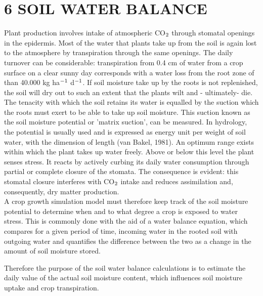 \documentclass[11pt]{article}
\newcommand{\FigDir}{.}
\begin{document}
\setcounter{page}{81}\pagenumpos{\pnbr}
\section{  6 SOIL WATER BALANCE  }

\bigskip
\bigskip
Plant production involves intake of atmospheric CO$_{{\rm 2}}$ through stomatal openings in the
epidermis. Most of the water that plants take up from the soil is again lost to the
atmosphere by transpiration through the same openings. The daily turnover can be
considerable: transpiration from 0.4 cm of water from a crop surface on a clear sunny
day corresponds with a water loss from the root zone of than 40.000 kg ha$^{{\rm -1}}$ d$^{{\rm -1}}$. If soil
moisture take up by the roots is not replenished, the soil will dry out to such an extent
that the plants wilt and - ultimately- die. \\
The tenacity with which the soil retains its water is equalled by the suction which the
roots must exert to be able to take up soil moisture. This suction known as the soil
moisture potential or 'matrix suction', can be measured. In hydrology, the potential is
usually used and is expressed as energy unit per weight of soil water, with the dimension
of length (van Bakel, 1981). An optimum range exists within which the plant takes up
water freely. Above or below this level the plant senses stress. It reacts by actively
curbing its daily water consumption through partial or complete closure of the stomata.
The consequence is evident: this stomatal closure interferes with CO$_{{\rm 2}}$ intake and reduces
assimilation and, consequently, dry matter production.\\
A crop growth simulation model must therefore keep track of the soil moisture potential
to determine when and to what degree a crop is exposed to water stress. This is common\-ly done with the aid of a water balance equation, which compares for a given period of
time, incoming water in the rooted soil with outgoing water and quantifies the difference
between the two as a change in the amount of soil moisture stored.

Therefore the purpose of the soil water balance calculations is to estimate the daily value
of the actual soil moisture content, which influences soil moisture uptake and crop
transpiration.\\
\begin{figure}[htbp]
\begin{forcewidth}{12.06cm}
 \begin{center}\InputPS{\FigDir/WATBAL1.eps} \end{center}
\end{forcewidth}
\end{figure}
\end{document}
